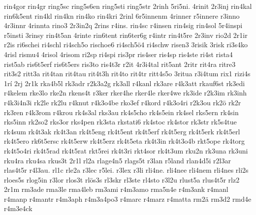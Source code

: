 {    rin4gor
    rin4gr
    ring5sc
    ring5s6en
    ring5sti
    ring5str
    2rinh
    5ri5ni.
    4rinit
    2r3inj
    rin4kal
    rin6k5ent
    rin4kl
    rin4kn
    rin4ko
    rin4kri
    2rinl
    6r5innenm
    4rinner
    r5innere
    r3inno
    4r3innr
    4rinnta
    rino3
    2r3in2q
    2rins
    r4ins.
    rin4sc
    r4insen
    rin4sig
    rin4sol
    5r4inspi
    r5insti
    3rinsy
    rin4t5an
    4rinte
    rin6tent
    rin6ter6g
    r4intr
    rin4t5re
    2r3inv
    rio2d
    2r1ir
    r2is
    ri6schei
    ri4schl
    ri4sch5o
    rischoe6
    ri4sch5ö4
    ri4schw
    risen3
    3risik
    3risk
    ri3s4ko
    4risl
    rismu4
    4risol
    4risom
    ri2sp
    ri4spi
    ris3pr
    ris4ser
    ris4sp
    ris4ste
    ri4st
    rista4
    rist5ab
    ris6t5erf
    ris6t5ers
    ris3to
    ris4t3r
    r2it
    4r3i4tal
    rit5ant
    2ritr
    rit4ra
    ritre3
    rit3s2
    ritt3a
    rit4tan
    rit4tau
    rit4t3h
    rit4to
    rit4tr
    ritt4s5o
    3ritua
    r3i4tum
    rix1
    rizi4s
    1rí
    2rj
    2r1k
    rka4b5l
    rk3adr
    r2k3a2g
    rk3all
    r4kanl
    rk3are
    r4k3att
    rkauf6st
    rk3edi
    r4kelem
    rke3lo
    rke2n
    rkens4t
    r3ker
    rker4he
    rker4le
    rker4we
    rk3ide
    r2k3im
    rk3inh
    r4k3i4n3i
    rk2le
    rk2lu
    r4knut
    r4k3o4be
    rko3ef
    r4kord
    r4k3o4ri
    r2k3ou
    rk2ö
    rk2r
    rk3ren
    r4k3rom
    r4krou
    rk4s3al
    rks3au
    rk4s5cho
    rk4s5ein
    rk4sel
    rks5ern
    rk4sin
    rks5inn
    rk2so2
    rks3or
    rks4pen
    rk3sta
    rkstati6
    rk4stoc
    rk4stor
    rk3str
    rk5s4tue
    rk4sum
    rk4t3ak
    rk4t3an
    rk4t5eng
    rk4t5ent
    rk4t5erf
    rk4t5erg
    rk4t5erk
    rk4t5erl
    rk4t5ero
    rk6t5ersc
    rk4t5erw
    rk4t5erz
    rk4t5eta
    rk4t3in
    rk4t3o4b
    rkt5ope
    rk4torg
    rk4t5o4ri
    rk4t5rad
    rk4t5rat
    rkt5rei
    rk4t3ri
    rkt4sor
    rk4t3um
    rku2n
    rk3una
    rk3uni
    rku4ra
    rku4sa
    rkus3t
    2r1l
    rl2a
    rlage4n5
    rlags5t
    r3lan
    r5land
    rlan4d5i
    r2l3ar
    rlas4t5r
    r4l3au.
    rl1c
    rle2a
    r3lec
    r5lei.
    r3lex
    r3li
    rli4ne.
    rli4nee
    rli4nem
    rli4nes
    rli2s
    rloes5s
    rlog5in
    r3lor
    rlos3t
    rlös3s
    rl3skr
    rl3ste
    rl4sto
    r3l2u
    rlust5a
    rlus4t5r
    rlz2
    2r1m
    rm3ade
    rma3le
    rma4leb
    rm3ami
    r4m3amo
    rma5n4e
    r4m3ank
    r4manl
    r4manp
    r4mantr
    r4m3aph
    r4m3a4po3
    r4marc
    r4marz
    r4matta
    rm2ä
    rm3d2
    rmd4e
    r4m3e4ck
}
